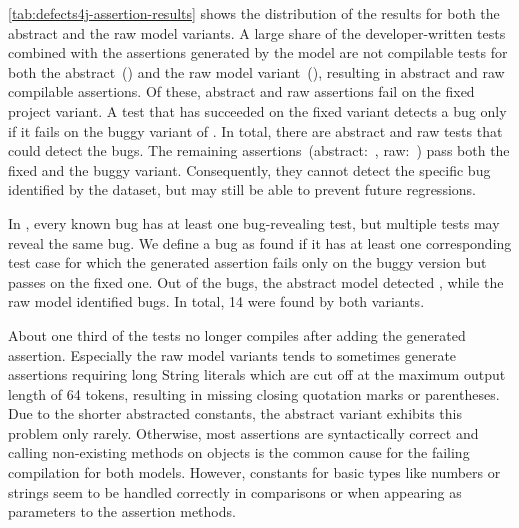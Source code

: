 \cref{tab:defects4j-assertion-results} shows the distribution of the
 results for both the abstract and the raw model variants.
A large share of the \dfjAssertionLocationInTestTotalTests{}
developer-written tests combined with the assertions generated by the
model are not compilable tests for both the
abstract~(\dfjAbstractNotCompilable) and the raw model
variant~(\dfjRawNotCompilable), resulting in
\dfjAbstractCompilableTestCases abstract and
\dfjRawCompilableTestCases raw compilable assertions. Of these,
\dfjAbstractFailsFixed abstract and \dfjRawFailsFixed raw assertions
fail on the fixed project variant. A test that has succeeded on the
fixed variant detects a bug only if it fails on the buggy variant of
. In total, there are \dfjAbstractFailsBuggy abstract and
\dfjRawFailsBuggy raw tests that could detect the bugs. The remaining
assertions~(abstract:~\dfjAbstractPassesBoth, raw:~\dfjRawPassesBoth)
pass both the fixed and the buggy variant. Consequently, they cannot
detect the specific bug identified by the  dataset, but
may still be able to prevent future regressions.

In , every known bug has at least one bug-revealing test,
but multiple tests may reveal the same bug.  We define a bug as found
if it has at least one corresponding test case for which the generated
assertion fails only on the buggy version but passes on the fixed one.
Out of the \dfjAssertionLocationInTestTotalBugs{} bugs, the abstract
\assertfive model detected \dfjAbstractFoundBugs, while the raw model
identified \dfjRawFoundBugs bugs. In total, 14 were found by both
variants.

About one third of the tests no longer compiles after adding the
generated assertion.
Especially the raw model variants tends to sometimes generate
assertions requiring long String literals which are cut off at the
maximum output length of 64 tokens, resulting in missing closing
quotation marks or parentheses. Due to the shorter abstracted
constants, the abstract variant exhibits this problem only rarely.
Otherwise, most assertions are syntactically correct and calling
non-existing methods on objects is the common cause for the failing
compilation for both models.
However, constants for basic types like numbers or strings seem to be
handled correctly in comparisons or when appearing as parameters to
the assertion methods.

